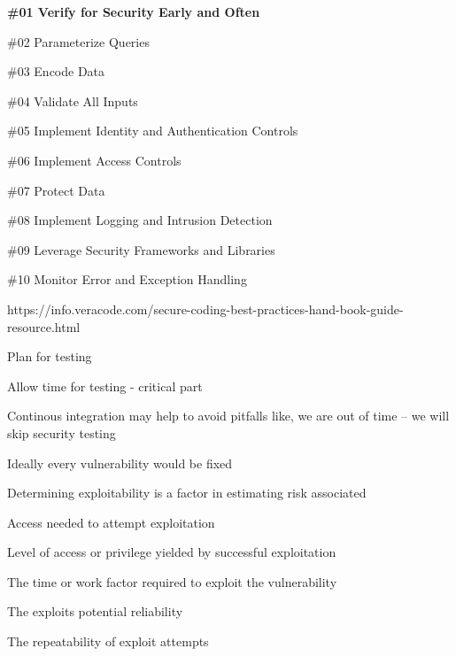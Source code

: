 \documentclass[Screen16to9,17pt]{foils}
\begin{document}

\begin{list2}
\item {\bf \#01 Verify for Security Early and Often}
\item \#02 Parameterize Queries
\item \#03 Encode Data
\item \#04 Validate All Inputs
\item \#05 Implement Identity and
Authentication Controls
\item \#06 Implement Access Controls
\item \#07 Protect Data
\item \#08 Implement Logging
and Intrusion Detection
\item \#09 Leverage Security
Frameworks and Libraries
\item \#10 Monitor Error and Exception
Handling
\end{list2}

{https://info.veracode.com/secure-coding-best-practices-hand-book-guide-resource.html}




\begin{list2}
\item Plan for testing
\item Allow time for testing - critical part
\item Continous integration may help to avoid pitfalls like, we are out of time -- we will skip security testing
\end{list2}




\begin{list1}
\item Ideally every vulnerability would be fixed
\item Determining exploitability is a factor in estimating risk associated
\begin{list2}
\item Access needed to attempt exploitation
\item Level of access or privilege yielded by successful exploitation
\item The time or work factor required to exploit the vulnerability
\item The exploits potential reliability
\item The repeatability of exploit attempts
\end{list2}
\end{list1}
\end{document}
